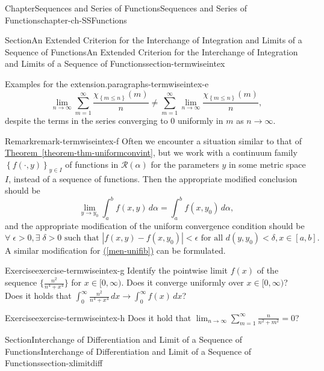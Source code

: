 \documentclass[oneside,10pt,]{book}
\newcommand{\xreffont}{\relax}
\numberwithin{equation}{section}
\begin{document}
\begin{chapterptx}{Chapter}{Sequences and Series of Functions}{}{Sequences and Series of Functions}{}{}{chapter-ch-SSFunctions}
\begin{sectionptx}{Section}{An Extended Criterion for the Interchange of Integration and Limits  of a Sequence of Functions}{}{An Extended Criterion for the Interchange of Integration and Limits  of a Sequence of Functions}{}{}{section-termwiseintex}
\begin{paragraphs}{Examples for the extension.}{paragraphs-termwiseintex-e}
\begin{equation*}
\lim_{n\to \infty}	\sum_{m=1}^{\infty} \frac{\chi_{\left\{m\le n\right\}}(m)}{n} \ne
\sum_{m=1}^{\infty} \lim_{n\to \infty} \frac{\chi_{\left\{m\le n\right\}}(m)}{n},
\end{equation*}
despite the terms in the series converging to \(0\) uniformly in \(m\) as \(n\to \infty\).%
\end{paragraphs}%
\begin{remark}{Remark}{}{remark-termwiseintex-f}%
Often we encounter a situation similar to that of \hyperref[theorem-thm-uniformconvint]{Theorem~{\xreffont\ref{theorem-thm-uniformconvint}}}, but we work with a continuum family \(\left\{f(\cdot, y)\right\}_{y\in I}\) of functions in \(\mathcal R (\alpha)\) for the parameters \(y\) in some metric space \(I\), instead of a sequence of functions. Then the appropriate modified conclusion should be%
\begin{equation*}
\lim_{y\to y_{0}} \int_{a}^{b} f(x, y)\, d\alpha = \int_{a}^{b} f(x, y_{0})\, d\alpha,
\end{equation*}
and the appropriate modification of the uniform convergence condition should be%
\begin{equation*}
\forall \; \epsilon >0, \exists\; \delta >0 \text{ such that } |f(x, y)-f(x, y_{0})| < \epsilon \text{ for all }
d(y, y_{0}) < \delta, x\in [a, b].
\end{equation*}
A similar modification for \hyperref[men-unifib]{({\xreffont\ref{men-unifib}})} can be formulated.%
\end{remark}
\begin{inlineexercise}{Exercise}{}{exercise-termwiseintex-g}%
Identify the pointwise limit \(f(x)\) of  the sequence \(\{ \frac{n^{2}}{n^{4}+x^{4}}\}\) for \(x\in [0, \infty)\).  Does it converge uniformly over \(x\in [0, \infty)\)? Does it holds that \(\int_{0}^{\infty }\frac{n^{2}}{n^{4}+x^{4}}\, dx \to 
\int_{0}^{\infty } f(x)\, dx\)?%
\end{inlineexercise}%
\begin{inlineexercise}{Exercise}{}{exercise-termwiseintex-h}%
Does it hold that        \(\lim_{n\to \infty}	\sum_{m=1}^{\infty}\frac{n}{n^{2}+ m^{2}}=0\)?%
\end{inlineexercise}%
\end{sectionptx}
%
%
\typeout{************************************************}
\typeout{************************************************}
%
\begin{sectionptx}{Section}{Interchange of Differentiation and Limit of a Sequence of  Functions}{}{Interchange of Differentiation and Limit of a Sequence of  Functions}{}{}{section-xlimitdiff}

\end{sectionptx}
\end{chapterptx}
\end{document}
